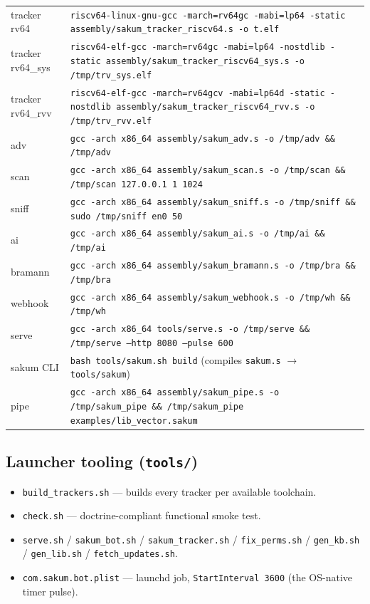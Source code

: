 \begin{table}[H]
\begin{tabularx}{\textwidth}{lX}
tracker rv64 & \texttt{riscv64-linux-gnu-gcc -march=rv64gc -mabi=lp64 -static assembly/sakum\_tracker\_riscv64.s -o t.elf} \\
tracker rv64\_sys & \texttt{riscv64-elf-gcc -march=rv64gc -mabi=lp64 -nostdlib -static assembly/sakum\_tracker\_riscv64\_sys.s -o /tmp/trv\_sys.elf} \\
tracker rv64\_rvv & \texttt{riscv64-elf-gcc -march=rv64gcv -mabi=lp64d -static -nostdlib assembly/sakum\_tracker\_riscv64\_rvv.s -o /tmp/trv\_rvv.elf} \\
adv & \texttt{gcc -arch x86\_64 assembly/sakum\_adv.s -o /tmp/adv \&\& /tmp/adv} \\
scan & \texttt{gcc -arch x86\_64 assembly/sakum\_scan.s -o /tmp/scan \&\& /tmp/scan 127.0.0.1 1 1024} \\
sniff & \texttt{gcc -arch x86\_64 assembly/sakum\_sniff.s -o /tmp/sniff \&\& sudo /tmp/sniff en0 50} \\
ai & \texttt{gcc -arch x86\_64 assembly/sakum\_ai.s -o /tmp/ai \&\& /tmp/ai} \\
bramann & \texttt{gcc -arch x86\_64 assembly/sakum\_bramann.s -o /tmp/bra \&\& /tmp/bra} \\
webhook & \texttt{gcc -arch x86\_64 assembly/sakum\_webhook.s -o /tmp/wh \&\& /tmp/wh} \\
serve & \texttt{gcc -arch x86\_64 tools/serve.s -o /tmp/serve \&\& /tmp/serve --http 8080 --pulse 600} \\
sakum CLI & \texttt{bash tools/sakum.sh build} (compiles \texttt{sakum.s} $\to$ \texttt{tools/sakum}) \\
pipe & \texttt{gcc -arch x86\_64 assembly/sakum\_pipe.s -o /tmp/sakum\_pipe \&\& /tmp/sakum\_pipe examples/lib\_vector.sakum} \\
\bottomrule
\end{tabularx}
\end{table}

\subsection{Launcher tooling (\texttt{tools/})}

\begin{itemize}
  \item \texttt{build\_trackers.sh} --- builds every tracker per available
    toolchain.
  \item \texttt{check.sh} --- doctrine-compliant functional smoke test.
  \item \texttt{serve.sh} / \texttt{sakum\_bot.sh} / \texttt{sakum\_tracker.sh}
    / \texttt{fix\_perms.sh} / \texttt{gen\_kb.sh} / \texttt{gen\_lib.sh} /
    \texttt{fetch\_updates.sh}.
  \item \texttt{com.sakum.bot.plist} --- launchd job,
    \texttt{StartInterval 3600} (the OS-native timer pulse).
\end{itemize}

